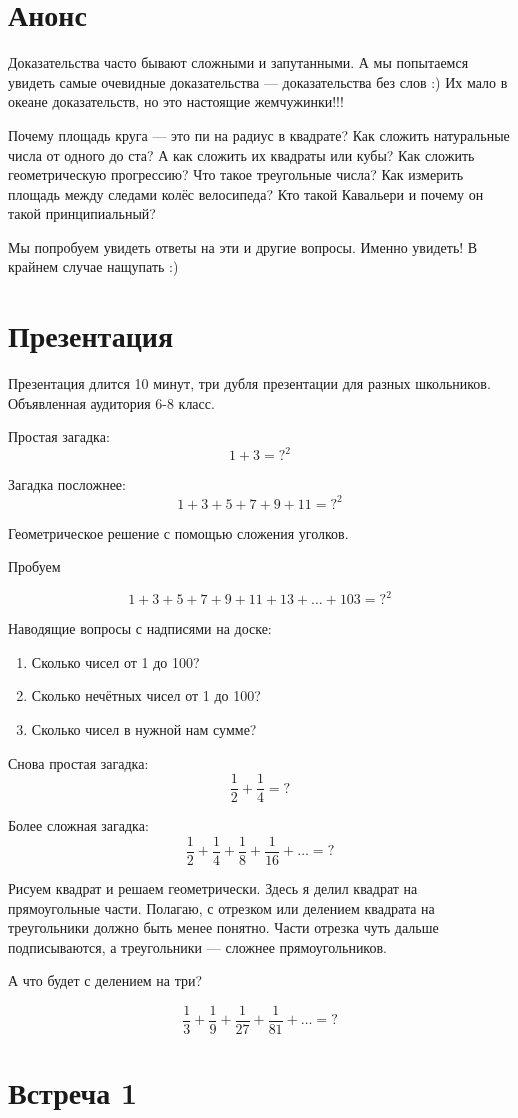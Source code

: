 \documentclass[a4paper, 12pt]{article}
\begin{document}
\section{Анонс}

Доказательства часто бывают сложными и запутанными. А мы попытаемся увидеть самые очевидные доказательства — доказательства без слов :) Их мало в океане доказательств, но это настоящие жемчужинки!!! 

Почему площадь круга — это пи на радиус в квадрате? Как сложить натуральные числа от одного до ста? А как сложить их квадраты или кубы? Как сложить геометрическую прогрессию? Что такое треугольные числа? Как измерить площадь между следами колёс велосипеда? Кто такой Кавальери и почему он такой принципиальный? 

Мы попробуем увидеть ответы на эти и другие вопросы. Именно увидеть! В крайнем случае нащупать :)


\section{Презентация}

Презентация длится 10 минут, три дубля презентации для разных школьников. 
Объявленная аудитория 6-8 класс.

Простая загадка:
\[
   1 + 3 = ?^2
\]

Загадка посложнее:
\[
 1 + 3 + 5 + 7 + 9 + 11 = ?^2
\]

Геометрическое решение с помощью сложения уголков.

Пробуем 

\[
 1 + 3 + 5 + 7 + 9 + 11 + 13 + \ldots + 103 = ?^2
\]

Наводящие вопросы с надписями на доске:
\begin{enumerate}
  \item Сколько чисел от 1 до 100?
  \item Сколько нечётных чисел от 1 до 100?
  \item Сколько чисел в нужной нам сумме?
\end{enumerate}


Снова простая загадка:
\[
  \frac{1}{2} + \frac{1}{4} = ?
\]


Более сложная загадка:
\[
  \frac{1}{2} + \frac{1}{4} + \frac{1}{8} + \frac{1}{16} + \ldots = ?
\]


Рисуем квадрат и решаем геометрически. 
Здесь я делил квадрат на прямоугольные части. 
Полагаю, с отрезком или делением квадрата на треугольники должно быть менее понятно. 
Части отрезка чуть дальше подписываются,
а треугольники — сложнее прямоугольников.

А что будет с делением на три?

\[
  \frac{1}{3} + \frac{1}{9} + \frac{1}{27} + \frac{1}{81} + \ldots = ?
\]




\section{Встреча 1}
\end{document}
